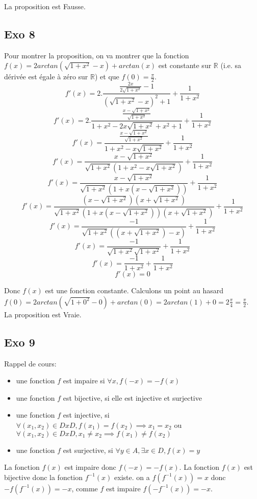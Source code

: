 \documentclass[]{book}
\theoremstyle{definition}
\newcommand{\bb}[1]{\mathbb{#1}}
\newcommand{\R}{\bb{R}}
\begin{document}
La proposition est Fausse.

\subsection*{Exo 8}
Pour montrer la proposition, on va montrer que la fonction $f(x) = 2arctan(\sqrt{1+x^2} - x) + arctan(x)$ est constante sur $\R$ (i.e. sa d\'eriv\'ee est \'egale \`a z\'ero sur $\R$) et que $f(0) = \frac{\pi}{2}$.
$$f'(x) = 2.\frac{\frac{2x}{2\sqrt{1+x^2}}-1}{(\sqrt{1+x^2}-x)^2+1} +\frac{1}{1+x^2}$$
$$f'(x) = 2.\frac{\frac{x-\sqrt{1+x^2}}{\sqrt{1+x^2}}}{1+x^2 -2x\sqrt{1+x^2} +x^2+1} +\frac{1}{1+x^2}$$
$$f'(x) = \frac{\frac{x-\sqrt{1+x^2}}{\sqrt{1+x^2}}}{1+x^2 -x\sqrt{1+x^2}} +\frac{1}{1+x^2}$$
$$f'(x) = \frac{x-\sqrt{1+x^2}}{\sqrt{1+x^2}(1+x^2 -x\sqrt{1+x^2})} +\frac{1}{1+x^2}$$
$$f'(x) = \frac{x-\sqrt{1+x^2}}{\sqrt{1+x^2}(1+x(x - \sqrt{1+x^2}))} +\frac{1}{1+x^2}$$
$$f'(x) = \frac{(x-\sqrt{1+x^2})(x+\sqrt{1+x^2})}{\sqrt{1+x^2}(1+x(x - \sqrt{1+x^2}))(x+\sqrt{1+x^2})} +\frac{1}{1+x^2}$$
$$f'(x) = \frac{-1}{\sqrt{1+x^2}((x+\sqrt{1+x^2})- x)} +\frac{1}{1+x^2}$$
$$f'(x) = \frac{-1}{\sqrt{1+x^2}\sqrt{1+x^2}} +\frac{1}{1+x^2}$$
$$f'(x) = \frac{-1}{1+x^2} +\frac{1}{1+x^2}$$
$$f'(x) = 0$$

Donc $f(x)$ est une fonction constante. Calculons un point au hasard $f(0) = 2arctan(\sqrt{1+0^2} - 0) + arctan(0) = 2arctan(1) + 0 = 2\frac{\pi}{4} = \frac{\pi}{2}$.\\


La proposition est Vraie.

\subsection*{Exo 9}
Rappel de cours:\\
\begin{itemize}
\item une fonction $f$ est impaire si $\forall x, f(-x) = -f(x)$
\item une fonction $f$ est bijective, si elle est injective et surjective
\item une fonction $f$ est injective, si $\forall (x_1, x_2) \in D x D, f(x_1) = f(x_2) \implies x_1 = x_2$ ou $\forall (x_1, x_2) \in D x D, x_1 \neq x_2 \implies f(x_1) \neq f(x_2)$
\item une fonction $f$ est surjective, si $\forall y \in A, \exists x \in D, f(x) = y$ 
\end{itemize}

La fonction $f(x)$ est impaire donc $f(-x) = -f(x)$. La fonction $f(x)$ est bijective donc la fonction $f^{-1}(x)$ existe.  on a $f(f^{-1}(x)) = x$ donc $-f(f^{-1}(x)) = -x$, comme $f$ est impaire $f(-f^{-1}(x)) = -x$.\\
\end{document}
